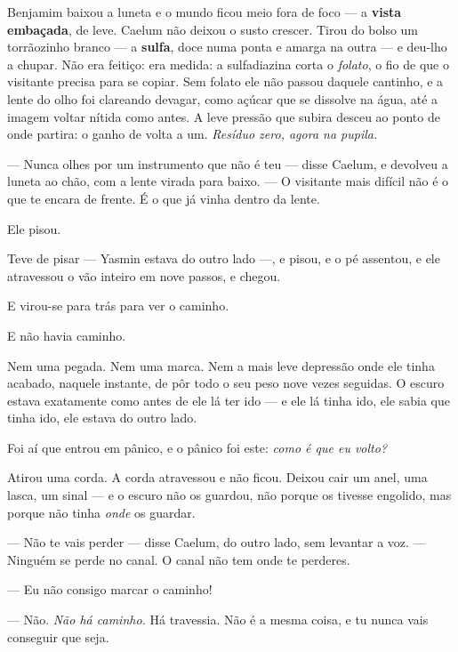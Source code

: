 \documentclass[livro.tex]{subfiles}
\begin{document}
\medskip

Benjamim baixou a luneta e o mundo ficou meio fora de foco --- a \textbf{vista embaçada}, de leve. Caelum não
deixou o susto crescer. Tirou do bolso um torrãozinho branco --- a \textbf{sulfa}, doce numa ponta e amarga na
outra --- e deu-lho a chupar. Não era feitiço: era medida: a sulfadiazina corta o \emph{folato}, o fio de que o
visitante precisa para se copiar. Sem folato ele não passou daquele cantinho, e a lente do olho foi clareando
devagar, como açúcar que se dissolve na água, até a imagem voltar nítida como antes. A leve pressão que subira
desceu ao ponto de onde partira: o ganho de volta a um. \emph{Resíduo zero, agora na pupila.}

\medskip

--- Nunca olhes por um instrumento que não é teu --- disse Caelum, e devolveu a luneta ao chão, com a lente virada
para baixo. --- O visitante mais difícil não é o que te encara de frente. É o que já vinha dentro da lente.

\medskip

Ele pisou.

Teve de pisar --- Yasmin estava do outro lado ---, e pisou, e o pé assentou, e ele atravessou o vão inteiro em nove
passos, e chegou.

E virou-se para trás para ver o caminho.

E não havia caminho.

Nem uma pegada. Nem uma marca. Nem a mais leve depressão onde ele tinha acabado, naquele instante, de pôr todo o
seu peso nove vezes seguidas. O escuro estava exatamente como antes de ele lá ter ido --- e ele lá tinha ido, ele
sabia que tinha ido, ele estava do outro lado.

\medskip

Foi aí que entrou em pânico, e o pânico foi este: \emph{como é que eu volto?}

Atirou uma corda. A corda atravessou e não ficou. Deixou cair um anel, uma lasca, um sinal --- e o escuro não os
guardou, não porque os tivesse engolido, mas porque não tinha \emph{onde} os guardar.

--- Não te vais perder --- disse Caelum, do outro lado, sem levantar a voz. --- Ninguém se perde no canal. O canal
não tem onde te perderes.

--- Eu não consigo marcar o caminho!

--- Não. \emph{Não há caminho.} Há travessia. Não é a mesma coisa, e tu nunca vais conseguir que seja.
\end{document}
